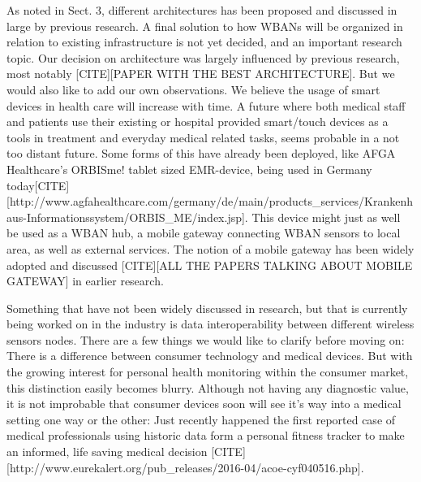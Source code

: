 As noted in Sect. 3, different architectures has been proposed and discussed in large by previous research. A final solution to how WBANs will be organized in relation to existing infrastructure is not yet decided, and an important research topic. Our decision on architecture was largely influenced by previous research, most notably [CITE][PAPER WITH THE BEST ARCHITECTURE]. But we would also like to add our own observations. We believe the usage of smart devices in health care will increase with time. A future where both medical staff and patients use their existing or hospital provided smart/touch devices as a tools in treatment and everyday medical related tasks, seems probable in a not too distant future. Some forms of this have already been deployed, like AFGA Healthcare's ORBISme! tablet sized EMR-device, being used in Germany today[CITE][http://www.agfahealthcare.com/germany/de/main/products_services/Krankenhaus-Informationssystem/ORBIS_ME/index.jsp]. This device might just as well be used as a WBAN hub, a mobile gateway connecting WBAN sensors to local area, as well as external services. The notion of a mobile gateway has been widely adopted and discussed [CITE][ALL THE PAPERS TALKING ABOUT MOBILE GATEWAY] in earlier research. 

Something that have not been widely discussed in research, but that is currently being worked on in the industry is data interoperability between different wireless sensors nodes. There are a few things we would like to clarify before moving on: There is a difference between consumer technology and medical devices. But with the growing interest for personal health monitoring within the consumer market, this distinction easily becomes blurry. Although not having any diagnostic value, it is not improbable that consumer devices soon will see it's way into a medical setting one way or the other: Just recently happened the first reported case of medical professionals using historic data form a personal fitness tracker to make an informed, life saving medical decision [CITE][http://www.eurekalert.org/pub_releases/2016-04/acoe-cyf040516.php].

